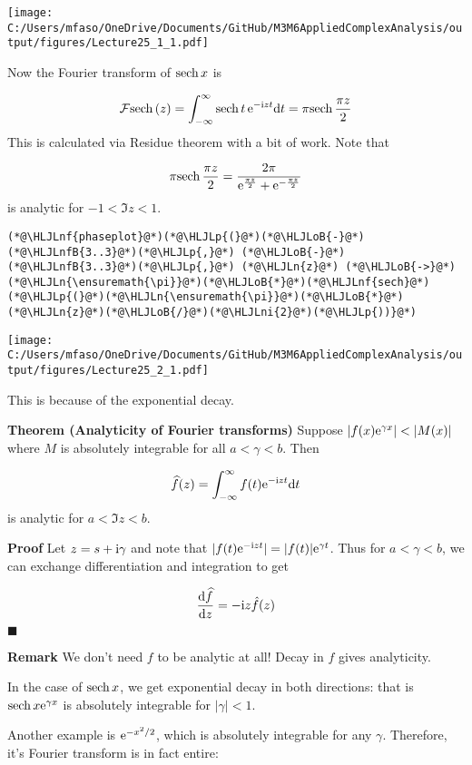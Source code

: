 \documentclass[12pt,a4paper]{article}
\newcommand{\HLJLn}[1]{#1}
\newcommand{\HLJLnf}[1]{\textcolor[RGB]{66,102,213}{#1}}
\newcommand{\HLJLnfB}[1]{\textcolor[RGB]{59,151,46}{#1}}
\newcommand{\HLJLni}[1]{\textcolor[RGB]{59,151,46}{#1}}
\newcommand{\HLJLoB}[1]{\textcolor[RGB]{102,102,102}{\textbf{#1}}}
\newcommand{\HLJLp}[1]{#1}
\def\D{ {\rm d} }
\def\I{ {\rm i} }
\def\E{ {\rm e} }
\def\FF{ {\cal F} }
\def\sech{ {\rm sech}\, }
\def\dt{\D t}
\def\dz{\D z}
\begin{document}
\texttt{[image: C:/Users/mfaso/OneDrive/Documents/GitHub/M3M6AppliedComplexAnalysis/output/figures/Lecture25\_1\_1.pdf]}

Now the Fourier transform of $\sech x$ is

\[
\FF\sech(z) = \int_{-\infty}^\infty \sech t \, \E^{-\I z t} \dt = \pi \sech{\pi z \over 2}
\]
This is calculated via Residue theorem with a bit of work. Note that

\[
\pi \sech {\pi z \over 2} = {2 \pi \over \E^{\pi z \over 2} + \E^{-{\pi z \over 2}}}
\]
is analytic for $-1 < \Im z < 1$.


\begin{lstlisting}
(*@\HLJLnf{phaseplot}@*)(*@\HLJLp{(}@*)(*@\HLJLoB{-}@*)(*@\HLJLnfB{3..3}@*)(*@\HLJLp{,}@*) (*@\HLJLoB{-}@*)(*@\HLJLnfB{3..3}@*)(*@\HLJLp{,}@*) (*@\HLJLn{z}@*) (*@\HLJLoB{->}@*) (*@\HLJLn{\ensuremath{\pi}}@*)(*@\HLJLoB{*}@*)(*@\HLJLnf{sech}@*)(*@\HLJLp{(}@*)(*@\HLJLn{\ensuremath{\pi}}@*)(*@\HLJLoB{*}@*)(*@\HLJLn{z}@*)(*@\HLJLoB{/}@*)(*@\HLJLni{2}@*)(*@\HLJLp{))}@*)
\end{lstlisting}

\texttt{[image: C:/Users/mfaso/OneDrive/Documents/GitHub/M3M6AppliedComplexAnalysis/output/figures/Lecture25\_2\_1.pdf]}

This is because of the exponential decay.

\textbf{Theorem (Analyticity of Fourier transforms)} Suppose $|f(x) \E^{\gamma x}| < |M(x)|$ where $M$ is absolutely integrable for all $a < \gamma < b$. Then

\[
\widehat f(z) = \int_{-\infty}^\infty f(t) \E^{-\I z t} \dt
\]
is analytic for $a < \Im z < b$.

\textbf{Proof} Let $z = s + \I \gamma$ and note that $|f(t) \E^{-\I z t}| = |f(t)| \E^{\gamma t}$. Thus for $a < \gamma < b$, we can exchange differentiation and integration to get

\[
{\D \widehat f \over \dz} = -\I z \hat f(z)
\]
\ensuremath{\blacksquare}

\textbf{Remark} We don't need $f$ to be analytic at all!  Decay in $f$ gives analyticity.

In the case of $\sech x$, we get exponential decay in both directions: that is $\sech x \E^{\gamma x}$ is absolutely integrable for $\vert \gamma \vert < 1$.

Another example is $\E^{-x^2/2}$, which is absolutely integrable for any $\gamma$. Therefore, it's Fourier transform is in fact entire:
\end{document}
